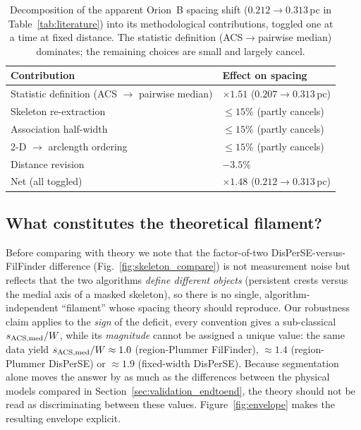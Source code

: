 \documentclass[usenatbib,twoside,twocolumn]{mnras}
\begin{document}
\begin{table}
\caption{Decomposition of the apparent Orion~B spacing shift ($0.212\to0.313$\,pc in Table~\ref{tab:literature}) into its methodological contributions, toggled one at a time at fixed distance. The statistic definition (ACS$\to$pairwise median) dominates; the remaining choices are small and largely cancel.}
\label{tab:decomp}
\footnotesize
\setlength{\tabcolsep}{4pt}
\begin{tabular}{@{}p{4.3cm}l@{}}
\toprule
Contribution & Effect on spacing \\
\midrule
Statistic definition (ACS $\to$ pairwise median) & $\times1.51$ ($0.207\!\to\!0.313$\,pc) \\
Skeleton re-extraction & $\le15\%$ (partly cancels) \\
Association half-width & $\le15\%$ (partly cancels) \\
2-D $\to$ arclength ordering & $\le15\%$ (partly cancels) \\
Distance revision & $-3.5\%$ \\
\midrule
Net (all toggled) & $\times1.48$ ($0.212\!\to\!0.313$\,pc) \\
\bottomrule
\end{tabular}
\end{table}

\subsection{What constitutes the theoretical filament?}
\label{sec:whatfilament}
Before comparing with theory we note that the factor-of-two DisPerSE-versus-FilFinder difference (Fig.~\ref{fig:skeleton_compare}) is not measurement noise but reflects that the two algorithms \emph{define different objects} (persistent crests versus the medial axis of a masked skeleton), so there is no single, algorithm-independent ``filament'' whose spacing theory should reproduce. Our robustness claim applies to the \emph{sign} of the deficit, every convention gives a sub-classical $s_{\rm ACS,med}/W$, while its \emph{magnitude} cannot be assigned a unique value: the same data yield $s_{\rm ACS,med}/W\approx1.0$ (region-Plummer FilFinder), $\approx1.4$ (region-Plummer DisPerSE) or $\approx1.9$ (fixed-width DisPerSE). Because segmentation alone moves the answer by as much as the differences between the physical models compared in Section~\ref{sec:validation_endtoend}, the theory should not be read as discriminating between these values. Figure~\ref{fig:envelope} makes the resulting envelope explicit.
\end{document}
